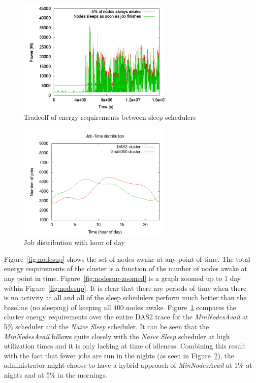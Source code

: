 \begin{figure}[ht]
\centering
\begin{center}
\includegraphics[width=3.0in]{graphs/time-energy.pdf}
\vspace{-0.1in}
\caption{{\normalsize Tradeoff of energy requirements between sleep schedulers}\label{fig:time-energy}}
\vspace{-0.1in}
\end{center}
\end{figure}

\begin{figure}[ht]
\centering
\begin{center}
\includegraphics[width=3.0in]{graphs/job-time.pdf}
\vspace{-0.1in}
\caption{{\normalsize Job distribution with hour of day}\label{fig:job-time}}
\vspace{-0.1in}
\end{center}
\end{figure}
Figure~\ref{fig:nodesup} shows the set of nodes awake at any point of time. The total energy requirements of the cluster is a function of the number of nodes awake at any point in time. Figure~\ref{fig:nodesup-zoomed} is a graph zoomed up to 1 day within Figure~\ref{fig:nodesup}. It is clear that there are periods of time when there is no activity at all and all of the sleep schedulers perform much better than the baseline (no sleeping) of keeping all 400 nodes awake. Figure~\ref{fig:time-energy} compares the cluster energy requirements over the entire DAS2 trace for the \emph{MinNodesAvail} at 5\% scheduler and the \emph{Naive Sleep} scheduler. It can be seen that the \emph{MinNodesAvail} follows quite closely with the \emph{Naive Sleep} scheduler at high utilization times and it is only lacking at time of idleness. Combining this result with the fact that fewer jobs are run in the nights (as seen in Figure~\ref{fig:job-time}), the administrator might choose to have a hybrid approach of \emph{MinNodesAvail} at 1\% at nights and at 5\% in the mornings.


